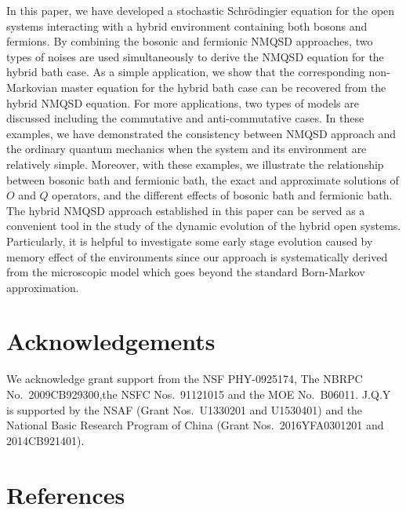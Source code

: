\documentclass[preprint]{elsarticle}
\begin{document}
\label{sec:V}

In this paper, we have developed a stochastic Schr\"odingier equation for
the open systems interacting with a hybrid environment containing both
bosons and fermions.  By combining the bosonic and fermionic NMQSD
approaches, two types of noises are used simultaneously to derive
the NMQSD equation for the hybrid bath case.  As a simple application, 
we show that the corresponding non-Markovian master equation for the hybrid bath case can be
recovered from the hybrid NMQSD equation. For more applications, two types of models are discussed 
including the commutative and anti-commutative cases.
In these examples, we have demonstrated  the consistency
between NMQSD approach and the ordinary quantum mechanics when the system and its environment are
relatively simple. Moreover, with these examples, 
we illustrate  the relationship between bosonic bath and fermionic bath, the exact and approximate
solutions of $O$ and $Q$ operators, and the different effects of
bosonic bath and fermionic bath. The hybrid NMQSD approach established
in this paper can be served as a convenient tool in the study of the dynamic 
evolution of the hybrid open
systems.  Particularly, it is helpful to investigate some early stage
evolution caused by memory effect of the environments since our approach
is systematically derived from the microscopic model which goes beyond
the standard Born-Markov approximation. 

\section*{Acknowledgements} We acknowledge grant support from the NSF
PHY-0925174, The NBRPC No.~2009CB929300,the NSFC Nos.~91121015 and the MOE No.~B06011.
J.Q.Y is supported by the NSAF (Grant Nos.~U1330201 and U1530401) and the National Basic Research 
Program of China (Grant Nos.~2016YFA0301201 and 2014CB921401).

\section*{References}
\end{document}
